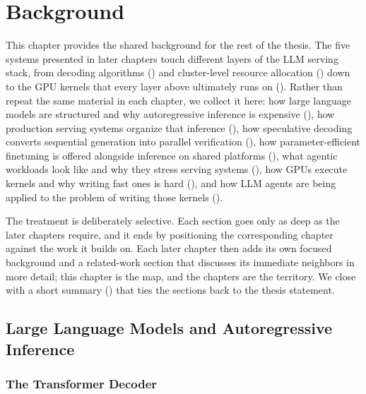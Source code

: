 \chapter{Background}
\label{ch:background}

This chapter provides the shared background for the rest of the thesis.
The five systems presented in later chapters touch different layers of the LLM serving stack, from decoding algorithms () and cluster-level resource allocation () down to the GPU kernels that every layer above ultimately runs on ().
Rather than repeat the same material in each chapter, we collect it here: how large language models are structured and why autoregressive inference is expensive (), how production serving systems organize that inference (), how speculative decoding converts sequential generation into parallel verification (), how parameter-efficient finetuning is offered alongside inference on shared platforms (), what agentic workloads look like and why they stress serving systems (), how GPUs execute kernels and why writing fast ones is hard (), and how LLM agents are being applied to the problem of writing those kernels ().

The treatment is deliberately selective. Each section goes only as deep as the later chapters require, and it ends by positioning the corresponding chapter against the work it builds on. Each later chapter then adds its own focused background and a related-work section that discusses its immediate neighbors in more detail; this chapter is the map, and the chapters are the territory. We close with a short summary () that ties the sections back to the thesis statement.

\section{Large Language Models and Autoregressive Inference}
\label{background:sec:llm}

\subsection{The Transformer Decoder}
\label{background:subsec:transformer}

